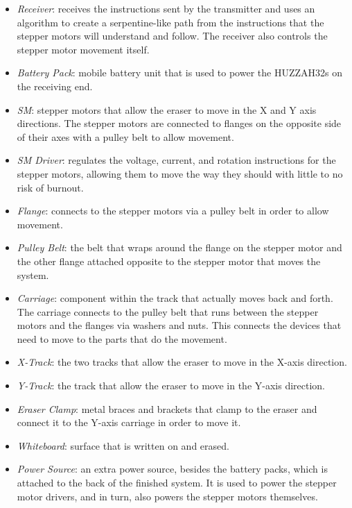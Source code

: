 \begin{itemize}
	\item \textit{Receiver}: receives the instructions sent by the transmitter and uses an algorithm to create a serpentine-like path from the instructions that the stepper motors will understand and follow. The receiver also controls the stepper motor movement itself.
	\item \textit{Battery Pack}: mobile battery unit that is used to power the HUZZAH32s on the receiving end.
	\item \textit{SM}: stepper motors that allow the eraser to move in the X and Y axis directions. The stepper motors are connected to flanges on the opposite side of their axes with a pulley belt to allow movement.
	\item \textit{SM Driver}: regulates the voltage, current, and rotation instructions for the stepper motors, allowing them to move the way they should with little to no risk of burnout.
	\item \textit{Flange}: connects to the stepper motors via a pulley belt in order to allow movement.
	\item \textit{Pulley Belt}: the belt that wraps around the flange on the stepper motor and the other flange attached opposite to the stepper motor that moves the system.
	\item \textit{Carriage}: component within the track that actually moves back and forth. The carriage connects to the pulley belt that runs between the stepper motors and the flanges via washers and nuts. This connects the devices that need to move to the parts that do the movement.
	\item \textit{X-Track}: the two tracks that allow the eraser to move in the X-axis direction.
	\item \textit{Y-Track}: the track that allow the eraser to move in the Y-axis direction.
	\item \textit{Eraser Clamp}: metal braces and brackets that clamp to the eraser and connect it to the Y-axis carriage in order to move it.
	\item \textit{Whiteboard}: surface that is written on and erased.
	\item \textit{Power Source}: an extra power source, besides the battery packs, which is attached to the back of the finished system. It is used to power the stepper motor drivers, and in turn, also powers the stepper motors themselves.
	 
\end{itemize} \par
